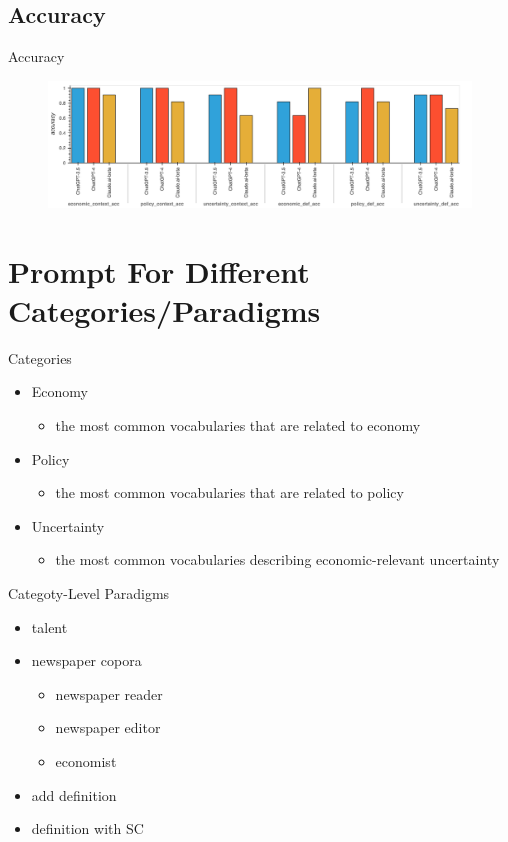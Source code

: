 \documentclass[12pt]{beamer}
\begin{document}
\subsection{Accuracy}
\begin{frame}{Accuracy}
\begin{figure}[H]
\centering
\includegraphics[width=11.5cm]{Figures/fig10.png}
\end{figure}
\end{frame}


\section{Prompt For Different Categories/Paradigms}


\begin{frame}
\end{frame}


\begin{frame}{Categories}
\begin{itemize}
    \item Economy
    \begin{itemize}
        \item the most common vocabularies that are related to economy
    \end{itemize}
    \item Policy
    \begin{itemize}
        \item the most common vocabularies that are related to policy
    \end{itemize}
    \item Uncertainty
    \begin{itemize}
        \item the most common vocabularies describing economic-relevant
            uncertainty
    \end{itemize}
\end{itemize}
\end{frame}


\begin{frame}{Categoty-Level Paradigms}
\begin{itemize}
    \item talent
    \item newspaper copora
    \begin{itemize}
        \item newspaper reader
        \item newspaper editor
        \item economist
    \end{itemize}
    \item add definition
    \item definition with SC
\end{itemize}
\end{frame}
\end{document}

